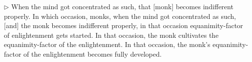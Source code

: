 
\addtocounter{sennum}{-2}
$\triangleright$  When the mind got concentrated as such, that [monk] becomes indifferent properly.  In which occasion, monks, when the mind got concentrated as such, [and] the monk becomes indifferent properly, in that occasion equanimity-factor of enlightenment gets started. In that occasion, the monk cultivates the equanimity-factor of the enlightenment. In that occasion, the monk's equanimity-factor of the enlightenment becomes fully developed.\\


